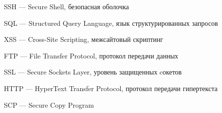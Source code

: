 \hypertarget{ssh}{SSH --- Secure Shell, безопасная оболочка}

\hypertarget{sql}{SQL --- Structured Query Language, язык структурированных запросов}

\hypertarget{xss}{XSS --- Cross-Site Scripting, межсайтовый скриптинг}

\hypertarget{ftp}{FTP --- File Transfer Protocol, протокол передачи данных}

\clearpage

\hypertarget{ssl}{SSL --- Secure Sockets Layer, уровень защищенных cокетов}

\hypertarget{http}{HTTP --- HyperText Transfer Protocol, протокол передачи гипертекста}

\hypertarget{scp}{SCP --- Secure Copy Program}

\clearpage
